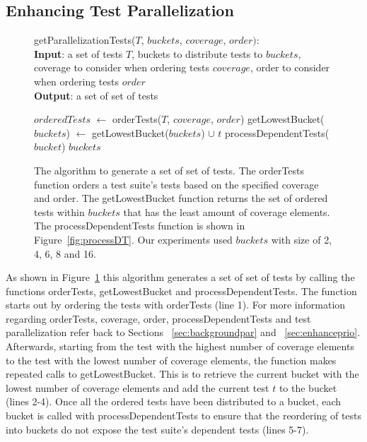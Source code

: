 \subsection{Enhancing Test Parallelization}
\label{sec:enhancepar}
\begin{figure}[t]
	getParallelizationTests($\mathit{T}$, $\mathit{buckets}$, $\mathit{coverage}$,
	$\mathit{order}):$\\
	\textbf{Input}: a set of tests $\mathit{T}$, buckets to distribute tests to
	$\mathit{buckets}$, coverage to consider when ordering tests 
	$\mathit{coverage}$, order to consider when ordering tests $\mathit{order}$\\
	\textbf{Output}: a set of set of tests\\
	 \begin{algorithmic}[1]
	 	\vspace{-5mm}
		\STATE $\mathit{orderedTests}$ $\leftarrow$ orderTests($\mathit{T}$,
		$\mathit{coverage}$, $\mathit{order}$)
			\STATE getLowestBucket($\mathit{buckets}$) $\leftarrow$
			getLowestBucket($\mathit{buckets}$) $\cup$ $\mathit{t}$
		\ENDFOR
			\STATE processDependentTests($\mathit{bucket}$)
		\ENDFOR
		\RETURN $\mathit{buckets}$
	\end{algorithmic}
	\vspace{-3mm}
	\caption {
		The algorithm to generate a set of set of tests. The orderTests function
		orders a test suite's tests based on the specified coverage and order.
		The getLowestBucket function returns the set of ordered tests within
		$\mathit{buckets}$ that has the least amount of coverage elements. The
		processDependentTests function is shown in Figure~\ref{fig:processDT}. Our
		experiments used $\mathit{buckets}$ with size of 2, 4, 6, 8 and 16.
	}
	\label{fig:parallelization}
\end{figure}

As shown in Figure~\ref{fig:parallelization} this algorithm generates a set of
set of tests by calling the functions orderTests, getLowestBucket and
processDependentTests. The function starts out by ordering the tests with
orderTests (line 1). For more information regarding orderTests, coverage, order,
processDependentTests and test parallelization refer back to Sections
 ~\ref{sec:backgroundpar} and ~\ref{sec:enhanceprio}. Afterwards, starting from
the test with the highest number of coverage elements to the test with the
lowest number of coverage elements, the function makes repeated calls to
getLowestBucket. This is to retrieve the current bucket with the lowest number
of coverage elements and add the current test $\mathit{t}$ to the bucket (lines
2-4). Once all the ordered tests have been distributed to a bucket, each bucket
is called with processDependentTests to ensure that the reordering of tests
into buckets do not expose the test suite's dependent tests (lines 5-7).
